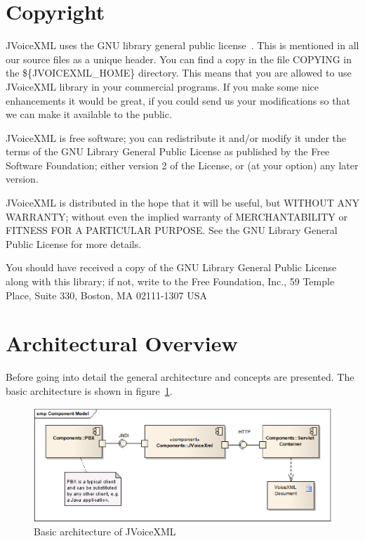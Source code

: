 \documentclass[11pt,a4paper]{article}
\begin{document}
\section{Copyright}
\label{sec:copyright}

JVoiceXML uses the GNU library general public license~\cite{gnu:lgpg}. 
This is mentioned in all our source files as a unique header.
You can find a copy in the file COPYING in the \$\{JVOICEXML\_HOME\}
directory. This means that you are allowed to use JVoiceXML
library in your commercial programs. If you make some nice
enhancements it would be great, if you could send us your
modifications so that we can make it available to the public.

JVoiceXML is free software; you can redistribute it and/or
modify it under the terms of the GNU Library General Public
License as published by the Free Software Foundation; either
version 2 of the License, or (at your option) any later version.

JVoiceXML is distributed in the hope that it will be useful,
but WITHOUT ANY WARRANTY; without even the implied warranty of
MERCHANTABILITY or FITNESS FOR A PARTICULAR PURPOSE. See the GNU
Library General Public License for more details.

You should have received a copy of the GNU Library General Public
License along with this library; if not, write to the Free
Foundation, Inc., 59 Temple Place, Suite 330, Boston, MA  02111-1307  USA

\section{Architectural Overview}
\label{sec:arch-overv}

Before going into detail the general architecture and concepts are presented.
The basic architecture is shown in figure~\ref{fig:architecture}.

\begin{figure}
\includegraphics[width=\linewidth]{architecture.eps}
\caption{Basic architecture of JVoiceXML}
\label{fig:architecture}
\end{figure}
\end{document}
